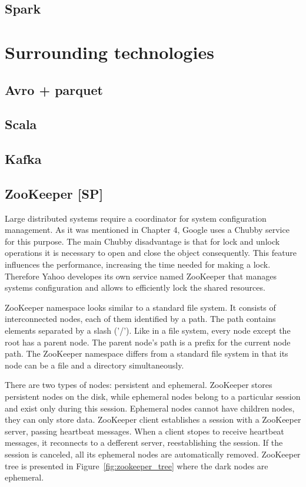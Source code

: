 \subsection{Spark}


\section{Surrounding technologies}

\subsection{Avro + parquet}

\subsection{Scala}

\subsection{Kafka}

\subsection{ZooKeeper [SP]}
Large distributed systems require a coordinator for system configuration management.
As it was mentioned in Chapter 4, Google uses a Chubby service for this purpose.
The main Chubby disadvantage is that for lock and unlock operations it is necessary to open and close the object consequently.
This feature influences the performance, increasing the time needed for making a lock.
Therefore Yahoo developes its own service named ZooKeeper that manages systems configuration and allows to efficiently lock the shared resources.

ZooKeeper namespace looks similar to a standard file system.
It consists of interconnected nodes, each of them identified by a path.
The path contains elements separated by a slash ('/').
Like in a file system, every node except the root has a parent node.
The parent node's path is a prefix for the current node path.
The ZooKeeper namespace differs from a standard file system in that its node can be a file and a directory simultaneously.

There are two types of nodes: persistent and ephemeral.
ZooKeeper stores persistent nodes on the disk, while ephemeral nodes belong to a particular session and exist only during this session.
Ephemeral nodes cannot have children nodes, they can only store data.
ZooKeeper client establishes a session with a ZooKeeper server, passing heartbeat messages.
When a client stopes to receive heartbeat messages, it reconnects to a defferent server, reestablishing the session.
If the session is canceled, all its ephemeral nodes are automatically removed.
ZooKeeper tree is presented in Figure~\ref{fig:zookeeper_tree} where the dark nodes are ephemeral.

